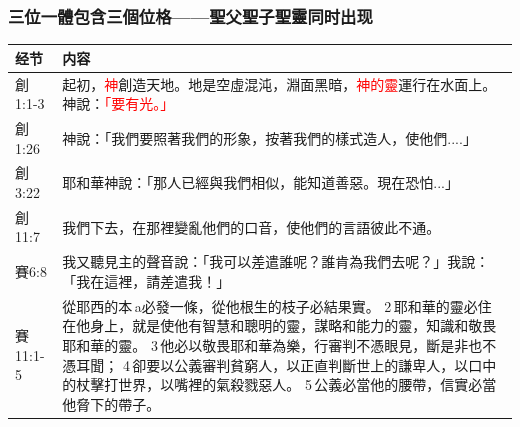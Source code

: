 \subsubsection{三位一體包含三個位格——聖父聖子聖靈同时出现}
\begin{table}[H]
\centering
\begin{tabular}{p{5.6em}p{43em}}  \toprule
经节&内容 \\  \midrule

創1:1-3&起初，\textcolor{red}{神}創造天地。地是空虛混沌，淵面黑暗，\textcolor{red}{神的靈}運行在水面上。神說：\textcolor{red}{「要有光。」 }\\  \midrule
創1:26&神說：「我們要照著我們的形象，按著我們的樣式造人，使他們....」 \\  \midrule
創3:22&耶和華神說：「那人已經與我們相似，能知道善惡。現在恐怕...」\\  \midrule
創11:7&我們下去，在那裡變亂他們的口音，使他們的言語彼此不通。\\  \midrule
賽6:8&我又聽見主的聲音說：「我可以差遣誰呢？誰肯為我們去呢？」我說：「我在這裡，請差遣我！」\\  \midrule
賽11:1-5&從耶西的本 a必發一條，從他根生的枝子必結果實。 2 耶和華的靈必住在他身上，就是使他有智慧和聰明的靈，謀略和能力的靈，知識和敬畏耶和華的靈。 3 他必以敬畏耶和華為樂，行審判不憑眼見，斷是非也不憑耳聞； 4 卻要以公義審判貧窮人，以正直判斷世上的謙卑人，以口中的杖擊打世界，以嘴裡的氣殺戮惡人。 5 公義必當他的腰帶，信實必當他脅下的帶子。\\  \midrule


\end{tabular}
\end{table}
